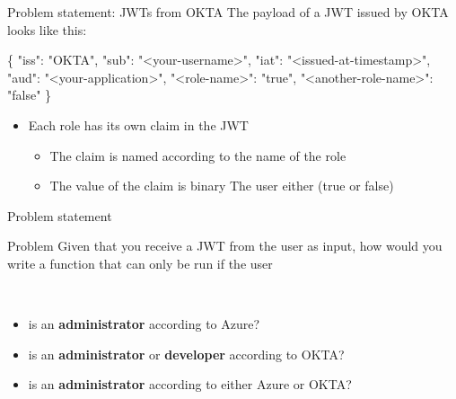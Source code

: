 \documentclass[
  9pt,
  ignorenonframetext,
]{beamer}
\newenvironment{Shaded}{}{}
\newcommand{\DataTypeTok}[1]{\textcolor[rgb]{0.56,0.13,0.00}{#1}}
\newcommand{\FunctionTok}[1]{\textcolor[rgb]{0.02,0.16,0.49}{#1}}
\newcommand{\StringTok}[1]{\textcolor[rgb]{0.25,0.44,0.63}{#1}}
\providecommand{\tightlist}{%
  \setlength{\itemsep}{0pt}\setlength{\parskip}{0pt}}
\begin{document}
\begin{frame}[fragile]{Problem statement: JWTs from OKTA}
\protect\hypertarget{problem-statement-jwts-from-okta}{}
The payload of a JWT issued by OKTA looks like this:

\begin{Shaded}
\begin{Highlighting}[]
\FunctionTok{\{}
  \DataTypeTok{"iss"}\FunctionTok{:} \StringTok{"OKTA"}\FunctionTok{,}
  \DataTypeTok{"sub"}\FunctionTok{:} \StringTok{"\textless{}your{-}username\textgreater{}"}\FunctionTok{,}
  \DataTypeTok{"iat"}\FunctionTok{:} \StringTok{"\textless{}issued{-}at{-}timestamp\textgreater{}"}\FunctionTok{,}
  \DataTypeTok{"aud"}\FunctionTok{:} \StringTok{"\textless{}your{-}application\textgreater{}"}\FunctionTok{,}
  \DataTypeTok{"\textless{}role{-}name\textgreater{}"}\FunctionTok{:} \StringTok{"true"}\FunctionTok{,}
  \DataTypeTok{"\textless{}another{-}role{-}name\textgreater{}"}\FunctionTok{:} \StringTok{"false"}
\FunctionTok{\}}
\end{Highlighting}
\end{Shaded}

\begin{itemize}
\tightlist
\item
  Each role has its own claim in the JWT

  \begin{itemize}
  \tightlist
  \item
    The claim is named according to the name of the role
  \item
    The value of the claim is binary The user either (true or false)
  \end{itemize}
\end{itemize}






\end{frame}

\begin{frame}{Problem statement}
\protect\hypertarget{problem-statement-2}{}
\begin{block}{Problem}
\protect\hypertarget{problem}{}
Given that you receive a JWT from the user as input, how would you write
a function that can only be run if the user\\
\strut \\

\begin{itemize}
\tightlist
\item
  is an \textbf{administrator} according to Azure?
\item
  is an \textbf{administrator} or \textbf{developer} according to OKTA?
\item
  is an \textbf{administrator} according to either Azure or OKTA?
\end{itemize}
\end{block}





\end{frame}
\end{document}
